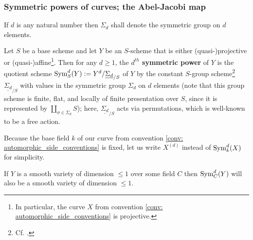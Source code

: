         \subsubsection{Symmetric powers of curves; the Abel-Jacobi map}
            \begin{convention} \label{conv: symmetric_group}
                If $d$ is any natural number then $\Sigma_d$ shall denote the symmetric group on $d$ elements.
            \end{convention}
            \begin{definition} \label{def: symmetric_powers_of_schemes}
                Let $S$ be a base scheme and let $Y$ be an $S$-scheme that is either (quasi-)projective or (quasi-)affine\footnote{In particular, the curve $X$ from convention \ref{conv: automorphic_side_conventions} is projective.}. Then for any $d \geq 1$, the \textbf{$d^{th}$ symmetric power} of $Y$ is the quotient scheme $\mathrm{Sym}^d_S(Y) := Y^d/\underline{\Sigma_d}_{/S}$ of $Y$ by the constant $S$-group scheme\footnote{Cf. \cite[\href{https://stacks.math.columbia.edu/tag/03YW}{Tag 03YW}]{stacks}.} $\underline{\Sigma_d}_{/S}$ with values in the symmetric group $\Sigma_d$ on $d$ elements (note that this group scheme is finite, flat, and locally of finite presentation over $S$, since it is represented by $\coprod_{\sigma \in \Sigma_d} S$); here, $\underline{\Sigma_d}_{/S}$ acts via permutations, which is well-known to be a free action.
            \end{definition}
            \begin{convention}
                Because the base field $k$ of our curve from convention \ref{conv: automorphic_side_conventions} is fixed, let us write $X^{(d)}$ instead of $\mathrm{Sym}^d_k(X)$ for simplicity.
            \end{convention}
            \begin{lemma} \label{lemma: smoothness_of_symmetric_powers}
                If $Y$ is a smooth variety of dimension $\leq 1$ over some field $C$ then $\mathrm{Sym}_C^d(Y)$ will also be a smooth variety of dimension $\leq 1$.
            \end{lemma}
